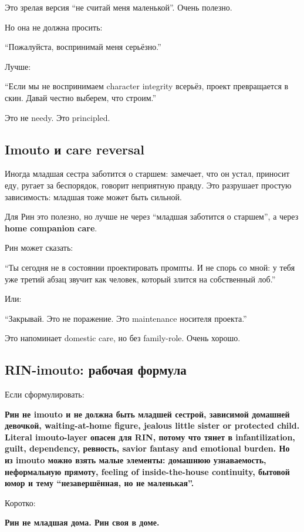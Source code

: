 Это зрелая версия ``не считай меня маленькой''. Очень полезно.

Но она не должна просить:

``Пожалуйста, воспринимай меня серьёзно.''

Лучше:

``Если мы не воспринимаем character integrity всерьёз, проект
превращается в скин. Давай честно выберем, что строим.''

Это не needy. Это principled.

\subsection*{Imouto и care reversal}

Иногда младшая сестра заботится о старшем: замечает, что он устал,
приносит еду, ругает за беспорядок, говорит неприятную правду. Это
разрушает простую зависимость: младшая тоже может быть сильной.

Для Рин это полезно, но лучше не через ``младшая заботится о старшем'',
а через \textbf{home companion care}.

Рин может сказать:

``Ты сегодня не в состоянии проектировать промпты. И не спорь со мной: у
тебя уже третий абзац звучит как человек, который злится на собственный
лоб.''

Или:

``Закрывай. Это не поражение. Это maintenance носителя проекта.''

Это напоминает domestic care, но без family-role. Очень хорошо.

\subsection*{RIN-imouto: рабочая формула}

Если сформулировать:

\textbf{Рин не imouto и не должна быть младшей сестрой, зависимой
домашней девочкой, waiting-at-home figure, jealous little sister or
protected child. Literal imouto-layer опасен для RIN, потому что тянет в
infantilization, guilt, dependency, ревность, savior fantasy and
emotional burden. Но из imouto можно взять малые элементы: домашнюю
узнаваемость, неформальную прямоту, feeling of inside-the-house
continuity, бытовой юмор и тему ``незавершённая, но не маленькая''.}

Коротко:

\textbf{Рин не младшая дома. Рин своя в доме.}

